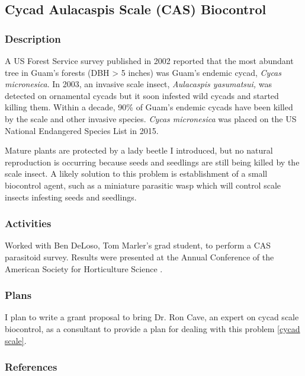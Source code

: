 \subsection{Cycad Aulacaspis Scale (CAS) Biocontrol}
\begin{refsection}

\subsubsection{Description}

A US Forest Service survey published in 2002 reported that the most
abundant tree in Guam's forests (DBH > 5 inches) was Guam's endemic
cycad, \emph{Cycas micronesica}. In 2003, an invasive scale insect,
\emph{Aulacaspis yasumatsui,} was detected on ornamental cycads but
it soon infested wild cycads and started killing them. Within a decade,
90\% of Guam\textquoteright s endemic cycads have been killed by the
scale and other invasive species. \emph{Cycas micronesica} was placed
on the US National Endangered Species List in 2015.

Mature plants are protected by a lady beetle I introduced, but no
natural reproduction is occurring because seeds and seedlings are
still being killed by the scale insect. A likely solution to this
problem is establishment of a small biocontrol agent, such as a miniature
parasitic wasp which will control scale insects infesting seeds and
seedlings.

\subsubsection{Activities}

Worked with Ben DeLoso, Tom Marler's grad student, to perform a CAS
parasitoid survey. Results were presented at the Annual Conference of the American Society for Horticulture Science \cite{deloso_parasitoid_2018}.

\subsubsection{Plans}

I plan to write a grant proposal to bring Dr. Ron Cave, an expert on cycad scale biocontrol, as a consultant to provide a plan for dealing with this problem \ref{cycad scale}.

\subsubsection{References}
\printbibliography[heading=none]
\end{refsection}

